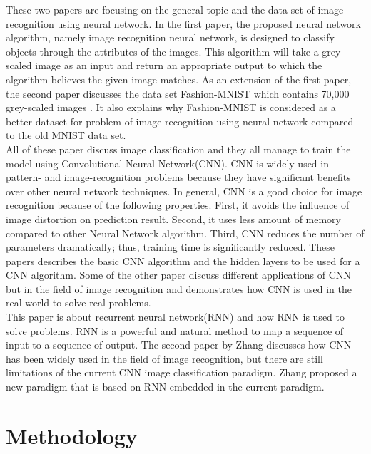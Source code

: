 \documentclass[letterpaper]{article} %
\begin{document}
\cite{cios1995image,xiao2017fashion} These two papers are focusing on the general topic and the data set of image recognition using neural network. In the first paper, the proposed neural network algorithm, namely image recognition neural network, is designed to classify objects through the attributes of the images. This algorithm will take a grey-scaled image as an input and return an appropriate output to which the algorithm believes the given image matches. As an extension of the first paper, the second paper discusses the data set Fashion-MNIST which contains 70,000 grey-scaled images . It also explains why Fashion-MNIST is considered as a better dataset for problem of image recognition using neural network compared to the old MNIST data set. \\
\cite{simonyan2015very,hijazi2015using,razavian2014cnn,chen2018the,hou2016fruit,lo1995artificial}
All of these paper discuss image classification and they all manage to train the model using Convolutional Neural Network(CNN). CNN is widely used in pattern- and image-recognition problems because they have significant benefits over other neural network techniques. In general, CNN is a good choice for image recognition because of the following properties. First, it avoids the influence of image distortion on prediction result. Second, it uses less amount of memory compared to other Neural Network algorithm. Third, CNN reduces the number of parameters dramatically; thus, training time is significantly reduced. These papers describes the basic CNN algorithm and the hidden layers to be used for a CNN algorithm. Some of the other paper discuss different applications of CNN but in the field of image recognition and demonstrates how CNN is used in the real world to solve real problems. \\
\cite{le2015a,zhang2018image} This paper is about recurrent neural network(RNN) and how RNN is used to solve problems. RNN is a powerful and natural method to map a sequence of input to a sequence of output. The second paper by Zhang discusses how CNN has been widely used in the field of image recognition, but there are still limitations of the current CNN image classification paradigm. Zhang proposed a new paradigm that is based on RNN embedded in the current paradigm.


\section{Methodology}
\end{document}

